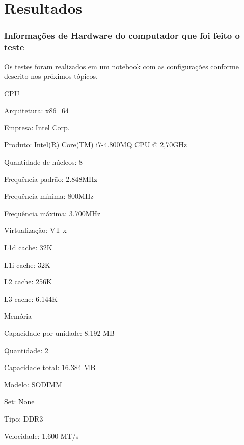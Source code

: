 \part{Resultados}



\section{Informações de Hardware do computador que foi feito o teste}

Os testes foram realizados em um notebook com as configurações conforme
descrito nos próximos tópicos.

\begin{alineas}

  \item CPU

  \begin{alineas}
     \item Arquitetura: x86_64
     \item Empresa: Intel Corp.
     \item Produto: Intel(R) Core(TM) i7-4.800MQ CPU @ 2,70GHz
     \item Quantidade de núcleos: 8
     \item Frequência padrão: 2.848MHz
     \item Frequência mínima:  800MHz
     \item Frequência máxima: 3.700MHz
     \item Virtualização: VT-x
     \item L1d cache: 32K
     \item L1i cache: 32K
     \item L2 cache: 256K
     \item L3 cache: 6.144K
  \end{alineas}

  \item Memória

  \begin{alineas}
     \item Capacidade por unidade: 8.192 MB
     \item Quantidade: 2
     \item Capacidade total: 16.384 MB
     \item Modelo: SODIMM
     \item Set: None
     \item Tipo: DDR3
     \item Velocidade: 1.600 MT/s
  \end{alineas}


\end{alineas}

